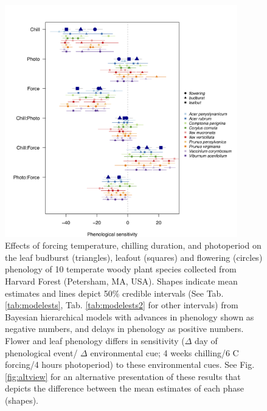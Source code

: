 \documentclass[12pt]{article}\usepackage[]{graphicx}\usepackage[]{color}
\begin{document}
\begin{figure}[h!]
    \centering
         \includegraphics[width=0.9\textwidth]{..//Plots/Flobuds_manuscript_figs/all3phases.png}
         \caption{Effects of forcing temperature, chilling duration, and photoperiod on the leaf budburst (triangles), leafout (squares) and flowering (circles) phenology of 10 temperate woody plant species collected from Harvard Forest (Petersham, MA, USA). Shapes indicate mean estimates and lines depict 50\% credible intervals (See Tab. \ref{tab:modelests}, Tab. \ref{tab:modelests2} for other intervals) from Bayesian hierarchical models with advances in phenology shown as negative numbers, and delays in phenology as positive numbers. Flower and leaf phenology differs in sensitivity ($\Delta$ day of phenological event/ $\Delta$ environmental cue; 4 weeks chilling/6 \degree C forcing/4 hours photoperiod) to these environmental cues. See Fig. \ref{fig:altview} for an alternative presentation of these results that depicts the difference between the mean estimates of each phase (shapes). }
    \label{fig:model}
\end{figure}
\end{document}
